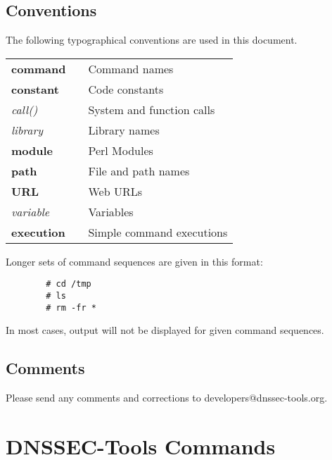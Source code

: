 \documentclass[12pt]{article}
\newcommand{\cmd}[1]{{\bf #1}}
\newcommand{\const}[1]{{\bf #1}}
\newcommand{\func}[1]{{\em #1}}
\newcommand{\lib}[1]{{\em #1}}
\newcommand{\perlmod}[1]{{\bf #1}}
\newcommand{\path}[1]{{\bf #1}}
\newcommand{\url}[1]{{\bf #1}}
\newcommand{\var}[1]{{\em #1}}
\newcommand{\xqt}[1]{{\bf #1}}
\begin{document}
\clearpage

\subsection{\bf Conventions}

The following typographical conventions are used in this document.

\begin{table}[hb]
\begin{tabular}{lll}
\cmd{command}		& & Command names\\
\const{constant}	& & Code constants\\
\func{call()}		& & System and function calls\\
\lib{library}		& & Library names\\
\perlmod{module}	& & Perl Modules\\
\path{path}		& & File and path names\\
\url{URL}		& & Web URLs\\
\var{variable}		& & Variables\\
\xqt{execution}		& & Simple command executions\\
\end{tabular}
\end{table}

Longer sets of command sequences are given in this format:
\begin{verbatim}
        # cd /tmp
        # ls
        # rm -fr *
\end{verbatim}
In most cases, output will not be displayed for given command sequences.

\vspace{.25in}

\subsection{\bf Comments}

Please send any comments and corrections to developers@dnssec-tools.org.


\clearpage

\section{DNSSEC-Tools Commands}
\label{sect-commands}
\end{document}
